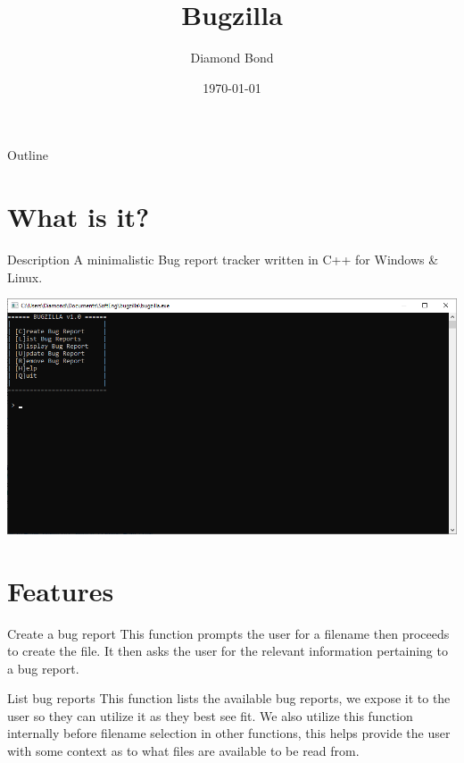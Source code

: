 \documentclass[bigger]{beamer}
\author{Diamond Bond}
\date{\today}
\title{Bugzilla}
\begin{document}
\maketitle
\begin{frame}{Outline}
\tableofcontents
\end{frame}


\section{What is it?}
\label{sec:org284ea5f}
\begin{frame}[label={sec:org4c7bdcf}]{Description}
A minimalistic Bug report tracker written in C++ for Windows \& Linux.

\begin{center}
\includegraphics[width=.9\linewidth]{../img/mainmenu.png}
\end{center}
\end{frame}

\section{Features}
\label{sec:org69cbd86}

\begin{frame}[label={sec:orgc39337c}]{Create a bug report}
This function prompts the user for a filename then proceeds to create the file.
It then asks the user for the relevant information pertaining to a bug report.
\end{frame}

\begin{frame}[label={sec:org5f2c64d}]{List bug reports}
This function lists the available bug reports, we expose it to the user so they can utilize it as they best see fit.
We also utilize this function internally before filename selection in other functions, this helps provide the user with some context as to what files are available to be read from.
\end{frame}
\end{document}
